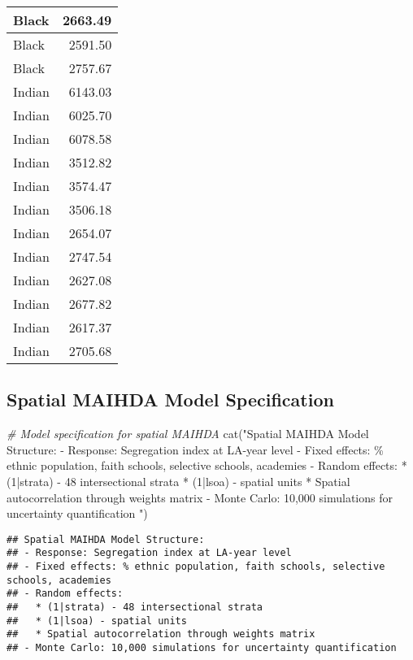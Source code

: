 \documentclass[
]{article}
\newenvironment{Shaded}{\begin{snugshade}}{\end{snugshade}}
\newcommand{\CommentTok}[1]{\textcolor[rgb]{0.56,0.35,0.01}{\textit{#1}}}
\newcommand{\FunctionTok}[1]{\textcolor[rgb]{0.00,0.00,0.00}{#1}}
\newcommand{\NormalTok}[1]{#1}
\newcommand{\StringTok}[1]{\textcolor[rgb]{0.31,0.60,0.02}{#1}}
\begin{document}
\begin{table}
\begin{tabular}[t]{l|r}
\hline
Black & 2663.49\\
\hline
Black & 2591.50\\
\hline
Black & 2757.67\\
\hline
Indian & 6143.03\\
\hline
Indian & 6025.70\\
\hline
Indian & 6078.58\\
\hline
Indian & 3512.82\\
\hline
Indian & 3574.47\\
\hline
Indian & 3506.18\\
\hline
Indian & 2654.07\\
\hline
Indian & 2747.54\\
\hline
Indian & 2627.08\\
\hline
Indian & 2677.82\\
\hline
Indian & 2617.37\\
\hline
Indian & 2705.68\\
\hline
\end{tabular}
\end{table}

\hypertarget{spatial-maihda-model-specification}{%
\subsection{Spatial MAIHDA Model
Specification}\label{spatial-maihda-model-specification}}

\begin{Shaded}
\begin{Highlighting}[]
\CommentTok{\# Model specification for spatial MAIHDA}
\FunctionTok{cat}\NormalTok{(}\StringTok{"Spatial MAIHDA Model Structure:}
\StringTok{{-} Response: Segregation index at LA{-}year level}
\StringTok{{-} Fixed effects: \% ethnic population, faith schools, selective schools, academies}
\StringTok{{-} Random effects: }
\StringTok{  * (1|strata) {-} 48 intersectional strata}
\StringTok{  * (1|lsoa) {-} spatial units}
\StringTok{  * Spatial autocorrelation through weights matrix}
\StringTok{{-} Monte Carlo: 10,000 simulations for uncertainty quantification}
\StringTok{"}\NormalTok{)}
\end{Highlighting}
\end{Shaded}

\begin{verbatim}
## Spatial MAIHDA Model Structure:
## - Response: Segregation index at LA-year level
## - Fixed effects: % ethnic population, faith schools, selective schools, academies
## - Random effects: 
##   * (1|strata) - 48 intersectional strata
##   * (1|lsoa) - spatial units
##   * Spatial autocorrelation through weights matrix
## - Monte Carlo: 10,000 simulations for uncertainty quantification
\end{verbatim}
\end{document}
